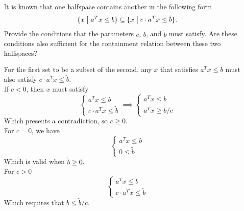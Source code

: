 \documentclass[11pt]{article}
\begin{document}
\pagebreak

\begin{homeworkProblem}

It is known that one halfspace contains another in the following form
\[
    \{x \bigm\vert a^T x \leq b\} \subseteq \{x \bigm\vert c \cdot a^T x \leq \tilde{b}\}.
\] Provide the conditions that the parameters $c$, $b$, and $\tilde{b}$ must satisfy. Are these conditions also sufficient for the
containment relation between these two halfspaces? \vspace{1\baselineskip}

\solution

For the first set to be a subset of the second, any $x$ that satisfies $a^T x \leq b$ must also satisfy $c \cdot a^T x \leq \tilde{b}$. \\

If $c < 0$, then $x$ must satisfy
\begin{equation*}
\begin{cases}
    a^T x \leq b \\
    c \cdot a^T x \leq \tilde{b}
\end{cases}
\implies
\begin{cases}
    a^T x \leq b \\
    a^T x \geq \tilde{b}/c
\end{cases}
\end{equation*}
Which presents a contradiction, so $c \geq 0$. \\

For $c = 0$, we have
\begin{equation*}
\begin{cases}
    a^T x \leq b \\
    0 \leq \tilde{b}
\end{cases}
\end{equation*}
Which is valid when $\tilde{b} \geq 0$. \\

For $c > 0$
\begin{equation*}
\begin{cases}
    a^T x \leq b \\
    c \cdot a^T x \leq \tilde{b}
\end{cases}
\end{equation*}
Which requires that $b \leq \tilde{b}/c$. \\

\end{homeworkProblem}

\pagebreak
\end{document}
